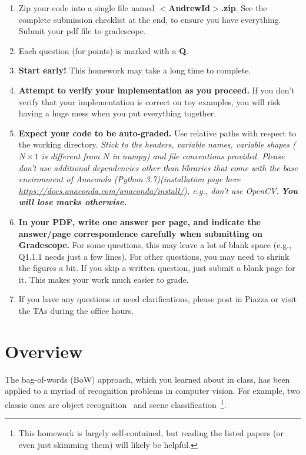 \documentclass[10pt]{article}
\begin{document}
\begin{enumerate}
\item Zip your code into a single file named {\bf $<$AndrewId$>$.zip}. See the complete submission checklist at the end, to ensure you have everything. Submit your pdf file to gradescope.
\item Each question (for points) is marked with a {\bf Q}.
\item {\bf Start early!} This homework may take a long time to complete.
\item {\bf Attempt to verify your implementation as you proceed.} If you don't verify that your implementation is correct on toy examples, you will risk having a huge mess when you put everything
together. 
\item {\bf Expect your code to be auto-graded.} Use relative paths with respect to the working directory. {\em Stick to the headers, variable names, variable shapes ($N \times 1$ is different from $N$ in numpy) and file conventions provided. Please don't use additional dependencies other than libraries that come with the base environment of Anaconda (Python 3.7)(installation page here \href{https://docs.anaconda.com/anaconda/install/}{https://docs.anaconda.com/anaconda/install/}), \textit{e.g.}, don't use OpenCV}. \textbf{\em You will lose marks otherwise.}
\item {\bf In your PDF, write one answer per page, and indicate the answer/page correspondence carefully when submitting on Gradescope.} For some questions, this may leave a lot of blank space (e.g., Q1.1.1 needs just a few lines). For other questions, you may need to shrink the figures a bit. If you skip a written question, just submit a blank page for it. This makes your work much easier to grade.
\item If you have any questions or need clarifications, please post in Piazza or visit the TAs during the office hours.
\end{enumerate}
\clearpage

\section*{Overview}\label{sec:overview}

The bag-of-words (BoW) approach, which you learned about in class, has been applied to a myriad of recognition problems in computer vision. For example, two classic ones are object recognition~\cite{790410,1544935} and scene classification~\cite{renninger2004scene,5539970}\footnote{This homework is largely self-contained, but reading the listed papers (or even just skimming them) will likely be helpful.}.
\end{document}
